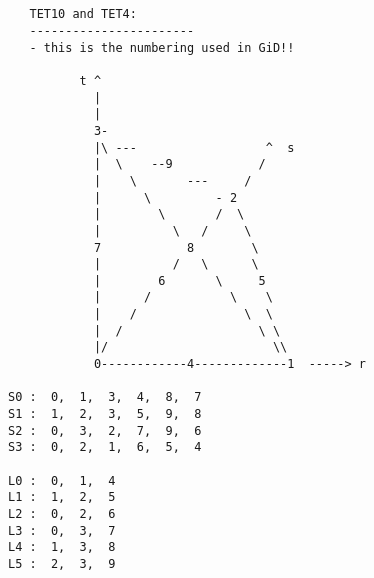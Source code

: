 \begin{verbatim}


   TET10 and TET4:
   -----------------------
   - this is the numbering used in GiD!!

          t ^
            |
            |
            3-
            |\ ---                  ^  s
            |  \    --9            /
            |    \       ---     /
            |      \         - 2
            |        \       /  \
            |          \   /     \
            7            8        \
            |          /   \      \
            |        6       \     5
            |      /           \    \
            |    /               \  \
            |  /                   \ \
            |/                       \\
            0------------4-------------1  -----> r

S0 :  0,  1,  3,  4,  8,  7
S1 :  1,  2,  3,  5,  9,  8
S2 :  0,  3,  2,  7,  9,  6
S3 :  0,  2,  1,  6,  5,  4

L0 :  0,  1,  4
L1 :  1,  2,  5
L2 :  0,  2,  6
L3 :  0,  3,  7
L4 :  1,  3,  8
L5 :  2,  3,  9

\end{verbatim}
\newpage




